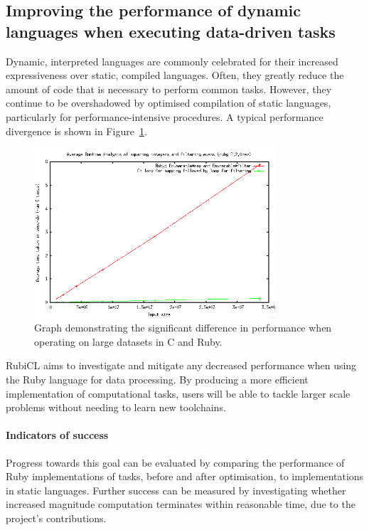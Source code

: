 \subsection{Improving the performance of dynamic languages when executing data-driven tasks}
Dynamic, interpreted languages are commonly celebrated for their increased expressiveness over static, compiled languages. Often, they greatly reduce the amount of code that is necessary to perform common tasks. However, they continue to be overshadowed by optimised compilation of static languages, particularly for performance-intensive procedures. A typical performance divergence is shown in Figure~\ref{fig:ruby_vs_c}.

\begin{figure}[h]
  \includegraphics[width=0.8\textwidth]{./figures/ruby_vs_c.png}
  \caption{Graph demonstrating the significant difference in performance when operating on large datasets in C and Ruby.}
  \label{fig:ruby_vs_c}
\end{figure}


RubiCL aims to investigate and mitigate any decreased performance when using the Ruby language for data processing. By producing a more efficient implementation of computational tasks, users will be able to tackle larger scale problems without needing to learn new toolchains.

\paragraph*{Indicators of success}
Progress towards this goal can be evaluated by comparing the performance of Ruby implementations of tasks, before and after optimisation, to implementations in static languages. Further success can be measured by investigating whether increased magnitude computation terminates within reasonable time, due to the project's contributions.

